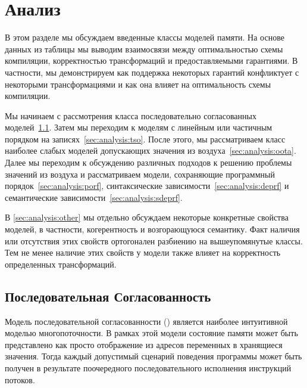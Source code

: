 \section{Анализ}
\label{sec:analysis}


В этом разделе мы обсуждаем введенные классы моделей памяти.
На основе данных из таблицы мы выводим взаимосвязи между оптимальностью схемы компиляции,
корректностью трансформаций и предоставляемыми гарантиями. 
В частности, мы демонстрируем как поддержка 
некоторых гарантий конфликтует с некоторыми трансформациями 
и как она влияет на оптимальность схемы компиляции. 

Мы начинаем с рассмотрения класса 
последовательно согласованных моделей~\cref{sec:analysis:seqcst}.
Затем мы переходим к моделям с линейным или 
частичным порядком на записях~\cref{sec:analysis:tso}.
После этого, мы рассматриваем класс наиболее слабых моделей 
допускающих значения из воздуха~\cref{sec:analysis:oota}.
Далее мы переходим к обсуждению различных подходов 
к решению проблемы значений из воздуха и рассматриваем модели, 
сохраняющие программный порядок~\cref{sec:analysis:porf},
синтаксические зависимости~\cref{sec:analysis:deprf} и
семантические зависимости~\cref{sec:analysis:sdeprf}.
 
В \cref{sec:analysis:other} мы отдельно обсуждаем некоторые 
конкретные свойства моделей, в частности, когерентность и возгорающуюся семантику. 
Факт наличия или отсутствия этих свойств ортогонален
разбиению на вышеупомянутые классы. 
Тем не менее наличие этих свойств у модели также влияет 
на корректность определенных трансформаций.

\subsection{Последовательная Согласованность}
\label{sec:analysis:seqcst}

Модель последовательной согласованности (\SC)
является наиболее интуитивной моделью многопоточности.
В рамках этой модели состояние памяти может быть 
представлено как просто отображение из 
адресов переменных в хранящиеся значения. 
Тогда каждый допустимый сценарий поведения программы 
может быть получен в результате поочередного последовательного
исполнения инструкций потоков. 

